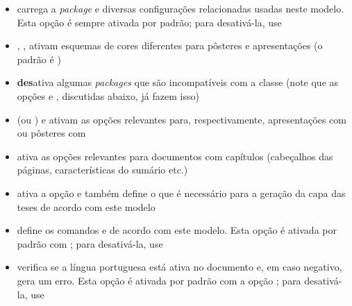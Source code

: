 \begin{itemize}
  \item {} carrega a \textit{package}  e diversas
        configurações relacionadas usadas neste modelo. Esta opção é
        sempre ativada por padrão; para desativá-la, use 

  \item {}, ,  ativam esquemas de cores
        diferentes para pôsteres e apresentações (o padrão é )

  \item {} \textbf{des}ativa algumas \textit{packages} que
        são incompatíveis com a classe  (note que as opções
         e , discutidas abaixo, já fazem isso)

  \item {} (ou ) e  ativam as
        opções relevantes para, respectivamente, apresentações com
         ou pôsteres com 

  \item {} ativa as opções relevantes para documentos com
        capítulos (cabeçalhos das páginas, características do sumário etc.)

  \item {} ativa a opção  e também define o que é
        necessário para a geração da capa das teses de acordo com este modelo

  \item {} define os comandos  e 
        de acordo com este modelo. Esta opção é ativada por padrão com
        ; para desativá-la, use 

  \item {} verifica se a língua portuguesa está ativa no
        documento e, em caso negativo, gera um erro. Esta opção é
        ativada por padrão com a opção ; para desativá-la,
        use 
\end{itemize}
